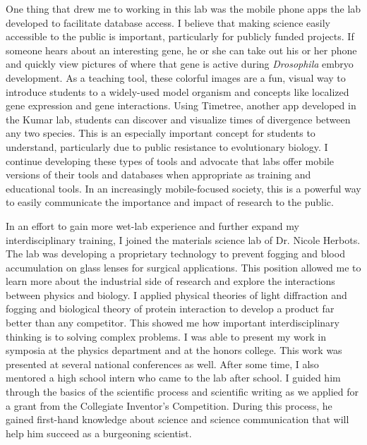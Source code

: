 \documentclass[12pt]{article}
\begin{document}
One thing that drew me to working in this lab was the mobile phone apps the lab developed to facilitate database access. I believe that making science easily accessible to the public is important, particularly for publicly funded projects. If someone hears about an interesting gene, he or she can take out his or her phone and quickly view pictures of where that gene is active during \textit{Drosophila} embryo development. As a teaching tool, these colorful images are a fun, visual way to introduce students to a widely-used model organism and concepts like localized gene expression and gene interactions. Using Timetree, another app developed in the Kumar lab, students can discover and visualize times of divergence between any two species. This is an especially important concept for students to understand, particularly due to public resistance to evolutionary biology. I continue developing these types of tools and advocate that labs offer mobile versions of their tools and databases when appropriate as training and educational tools. In an increasingly mobile-focused society, this is a powerful way to easily communicate the importance and impact of research to the public.

In an effort to gain more wet-lab experience and further expand my interdisciplinary training, I joined the materials science lab of Dr. Nicole Herbots. The lab was developing a proprietary technology to prevent fogging and blood accumulation on glass lenses for surgical applications. This position allowed me to learn more about the industrial side of research and explore the interactions between physics and biology. I applied physical theories of light diffraction and fogging and biological theory of protein interaction to develop a product far better than any competitor. This showed me how important interdisciplinary thinking is to solving complex problems. I was able to present my work in symposia at the physics department and at the honors college. This work was presented at several national conferences as well. After some time, I also mentored a high school intern who came to the lab after school. I guided him through the basics of the scientific process and scientific writing as we applied for a grant from the Collegiate Inventor's Competition. During this process, he gained first-hand knowledge about science and science communication that will help him succeed as a burgeoning scientist.
\end{document}
